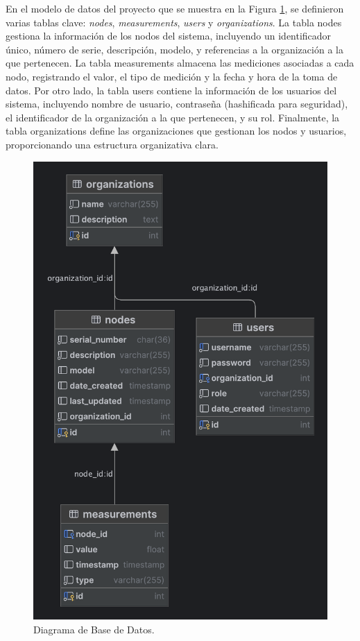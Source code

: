 En el modelo de datos del proyecto que se muestra en la Figura \ref{fig:db_diagram}, se definieron varias tablas clave: \textit{nodes}, \textit{measurements}, \textit{users} y \textit{organizations}. La tabla nodes gestiona la información de los nodos del sistema, incluyendo un identificador único, número de serie, descripción, modelo, y referencias a la organización a la que pertenecen. La tabla measurements almacena las mediciones asociadas a cada nodo, registrando el valor, el tipo de medición y la fecha y hora de la toma de datos. Por otro lado, la tabla users contiene la información de los usuarios del sistema, incluyendo nombre de usuario, contraseña (hashificada para seguridad), el identificador de la organización a la que pertenecen, y su rol. Finalmente, la tabla organizations define las organizaciones que gestionan los nodos y usuarios, proporcionando una estructura organizativa clara.

\begin{figure}[H]
	\centering
	\includegraphics[scale=.2]{./Figures/PortalWeb/smartcompost_db.png}
	\caption{Diagrama de Base de Datos.}
	\label{fig:db_diagram}
\end{figure}

